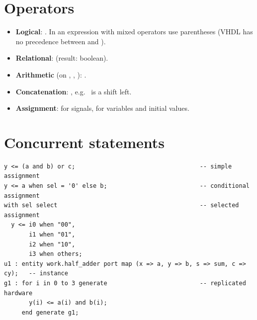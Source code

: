 \section{Operators}
\begin{itemize}
  \item \textbf{Logical}: . In an expression with mixed operators use parentheses (VHDL has no precedence between  and ).
  \item \textbf{Relational}: \code{= /= < <= > >=} (result: boolean).
  \item \textbf{Arithmetic} (on , , ): .
  \item \textbf{Concatenation}: \code{&}, e.g.\  is a shift left.
  \item \textbf{Assignment}: \code{<=} for signals, \code{:=} for variables and initial values.
\end{itemize}

\section{Concurrent statements}
\begin{lstlisting}[caption={Concurrent signal assignments.},label={lst:a-conc}]
y <= (a and b) or c;                                   -- simple assignment
y <= a when sel = '0' else b;                          -- conditional assignment
with sel select                                        -- selected assignment
  y <= i0 when "00",
       i1 when "01",
       i2 when "10",
       i3 when others;
u1 : entity work.half_adder port map (x => a, y => b, s => sum, c => cy);   -- instance
g1 : for i in 0 to 3 generate                          -- replicated hardware
       y(i) <= a(i) and b(i);
     end generate g1;
\end{lstlisting}

